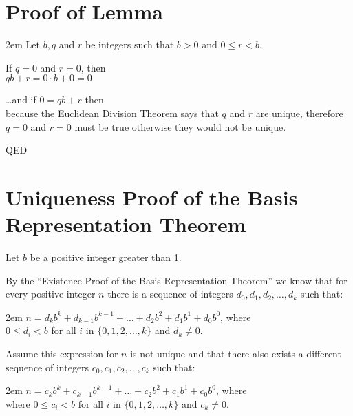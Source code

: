 \documentclass{article}
\newenvironment{jprIn}{\begin{adjustwidth}{2em}{}}{\end{adjustwidth}}
\begin{document}
\section*{Proof of Lemma}
\begin{jprIn}
Let $b, q$ and $r$ be integers such that $b>0$ and $0\le{}r<b$.

If $q=0$ and $r=0$, then \\
\hphantom{2em}$qb+r=0\cdot{}b+0=0$

\dots{}and if $0=qb+r$ then \\
\hphantom{2em}because the Euclidean Division Theorem says that $q$ and $r$ are unique, therefore\\
\hphantom{2em}$q=0$ and $r=0$ must be true otherwise they would not be unique.

QED
\end{jprIn}

\section*{Uniqueness Proof of the Basis Representation Theorem}

Let $b$ be a positive integer greater than 1.

By the ``Existence Proof of the Basis Representation Theorem'' we know
that for every positive integer $n$ there is a sequence
of integers $d_0, d_1, d_2,\dots{},d_k$ such that:
\begin{jprIn}
$n=d_kb^k+d_{k-1}b^{k-1}+\dots+d_2b^2+d_1b^1+d_0b^0$, where\\
\hphantom{2em}$0\le{}d_i<b$ for all $i$ in $\{0,1,2,\dots{},k\}$ and $d_k\ne0$.
\end{jprIn}

Assume this expression for $n$ is not unique and that there also exists
a different sequence
of integers $c_0, c_1, c_2,\dots{},c_k$ such that:
\begin{jprIn}
$n=c_kb^k+c_{k-1}b^{k-1}+\dots+c_2b^2+c_1b^1+c_0b^0$, where\\
\hphantom{2em}where $0\le{}c_i<b$ for all $i$ in $\{0,1,2,\dots{},k\}$ and $c_k\ne0$.
\end{jprIn}
\end{document}
